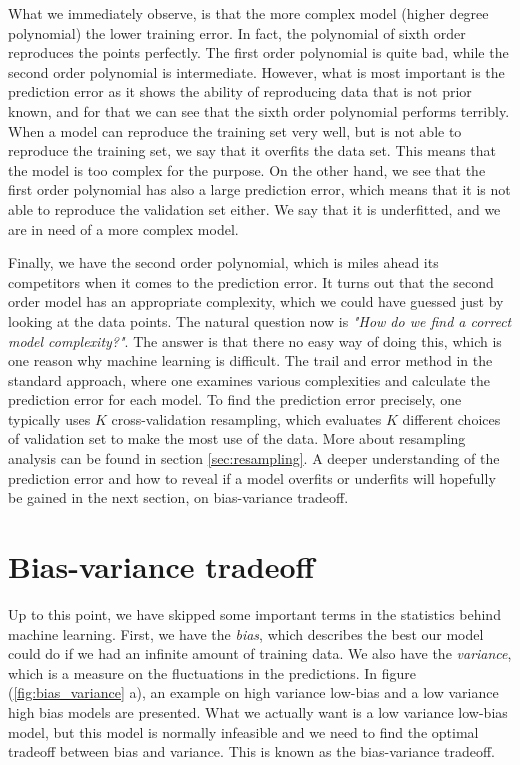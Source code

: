 What we immediately observe, is that the more complex model (higher degree polynomial) the lower training error. In fact, the polynomial of sixth order reproduces the points perfectly. The first order polynomial is quite bad, while the second order polynomial is intermediate. However, what is most important is the prediction error as it shows the ability of reproducing data that is not prior known, and for that we can see that the sixth order polynomial performs terribly. When a model can reproduce the training set very well, but is not able to reproduce the training set, we say that it overfits the data set. This means that the model is too complex for the purpose. On the other hand, we see that the first order polynomial has also a large prediction error, which means that it is not able to reproduce the validation set either. We say that it is underfitted, and we are in need of a more complex model.

Finally, we have the second order polynomial, which is miles ahead its competitors when it comes to the prediction error. It turns out that the second order model has an appropriate complexity, which we could have guessed just by looking at the data points. The natural question now is \textit{"How do we find a correct model complexity?"}. The answer is that there no easy way of doing this, which is one reason why machine learning is difficult. The trail and error method in the standard approach, where one examines various complexities and calculate the prediction error for each model. To find the prediction error precisely, one typically uses $K$ cross-validation resampling, which evaluates $K$ different choices of validation set to make the most use of the data. More about resampling analysis can be found in section \eqref{sec:resampling}. A deeper understanding of the prediction error and how to reveal if a model overfits or underfits will hopefully be gained in the next section, on bias-variance tradeoff. 

\section{Bias-variance tradeoff}
Up to this point, we have skipped some important terms in the statistics behind machine learning. First, we have the \textit{bias}, which describes the best our model could do if we had an infinite amount of training data. We also have the \textit{variance}, which is a measure on the fluctuations in the predictions. In figure (\ref{fig:bias_variance} a), an example on high variance low-bias and a low variance high bias models are presented. What we actually want is a low variance low-bias model, but this model is normally infeasible and we need to find the optimal tradeoff between bias and variance. This is known as the bias-variance tradeoff. 

